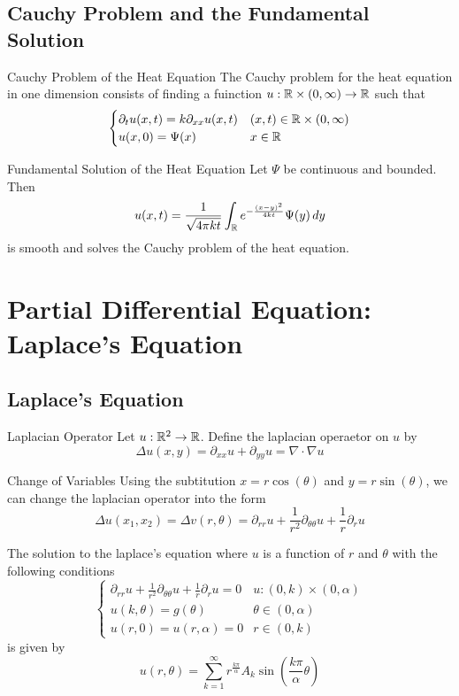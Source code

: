 \documentclass[a4paper]{article}
\begin{document}
\subsection{Cauchy Problem and the Fundamental Solution}
\begin{defn}{Cauchy Problem of the Heat Equation}{} The Cauchy problem for the heat equation in one dimension consists of finding a fuinction $u:\mathbb{R}\times(0,\infty)\to\mathbb{R}$ such that $$\begin{cases}
\partial_{t}u(x,t)=k\partial_{xx}u(x,t) & (x,t)\in\mathbb{R}\times(0,\infty)\\
u(x,0)=\Psi(x) & x\in\mathbb{R}
\end{cases}$$
\end{defn}

\begin{thm}{Fundamental Solution of the Heat Equation}{} Let $\Psi$ be continuous and bounded. Then $$u(x,t)=\frac{1}{\sqrt{4\pi kt}}\int_{\mathbb{R}} e^{-\frac{(x-y)^2}{4kt}}\Psi(y)\,dy$$ is smooth and solves the Cauchy problem of the heat equation. 
\end{thm}

\pagebreak
\section{Partial Differential Equation: Laplace's Equation}
\subsection{Laplace's Equation}
\begin{defn}{Laplacian Operator}{} Let $u:\mathbb{R}^2\to\mathbb{R}$. Define the laplacian operaetor on $u$ by $$\Delta u(x,y)=\partial_{xx}u+\partial_{yy}u=\nabla\cdot\nabla u$$
\end{defn}

\begin{prp}{Change of Variables}{} Using the subtitution $x=r\cos(\theta)$ and $y=r\sin(\theta)$, we can change the laplacian operator into the form $$\Delta u(x_1,x_2)=\Delta v(r,\theta)=\partial_{rr}u+\frac{1}{r^2}\partial_{\theta\theta}u+\frac{1}{r}\partial_ru$$
\end{prp}

\begin{thm}{}{} The solution to the laplace's equation where $u$ is a function of $r$ and $\theta$ with the following conditions $$\begin{cases}
\partial_{rr}u+\frac{1}{r^2}\partial_{\theta\theta}u+\frac{1}{r}\partial_ru=0 & u:(0,k)\times(0,\alpha)\\
u(k,\theta)=g(\theta) & \theta\in(0,\alpha)\\
u(r,0)=u(r,\alpha)=0 & r\in(0,k)
\end{cases}$$ is given by $$u(r,\theta)=\sum_{k=1}^\infty r^{\frac{k\pi}{\alpha}}A_k\sin\left(\frac{k\pi}{\alpha}\theta\right)$$
\end{thm}
\end{document}
